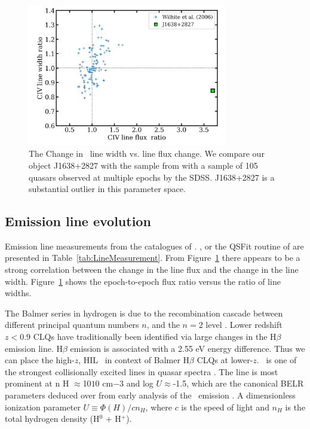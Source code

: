 \documentclass[a4paper,fleqn,usenatbib]{mnras}
\begin{document}
\begin{figure}
  \centering
  \includegraphics[width=8.7cm, trim=0.2cm 0.2cm 0.2cm 0.2cm, clip]
  {figures/Wilhite_2006_Fig2_redux_20190926.png}
   \vspace{-12pt}
  \caption[]{The Change in \civ\ line width vs. line flux change. 
We compare our object J1638+2827 with the sample 
from \citet{Wilhite2006} with a sample of 105 quasars observed at
multiple epochs by the SDSS. J1638+2827 is a substantial outlier 
in this parameter space.}
  \label{fig:Wilhite2006_comparison}
\end{figure}
\subsection{Emission line evolution}
Emission line measurements from the catalogues of  \citet{Shen2011}.
\citet{Hamann2017}, \citet{Kozlowski2017} or the QSFit routine of \citet{Calderone2017}
are presented in Table~\ref{tab:LineMeasurement}.
From Figure~\ref{fig:Wilhite2006_comparison} there appears to be a
strong correlation between the change in the line flux and the change
in the line width.  Figure~\ref{fig:Wilhite2006_comparison} shows the
epoch-to-epoch flux ratio versus the ratio of line widths.

The Balmer series in hydrogen is due to the recombination cascade
between different principal quantum numbers $n$, and
the $n=2$ level \citep[e.g., ][]{Seaton1959a, Seaton1959b}. 
Lower redshift $z<0.9$ CLQs have traditionally been identified via large changes in the
H$\beta$ emission line. H$\beta$ emission is associated with a 2.55 eV energy difference. 
Thus we can place the high-$z$, HIL \civ\ in context of Balmer H$\beta$ CLQs at lower-$z$. 
\civ\ is one of the strongest collisionally excited lines in quasar
spectra \citet[e.g.][]{HamannFerland1999}.  The line is most prominent
at n H $\approx$10$10$ cm$-3$ and log $U$$\approx$-1.5, which are the
canonical BELR parameters deduced over from early analysis of the
\civ\ emission \citep{Davidson_Netzer1979}.  A dimensionless
ionization parameter $U\equiv \Phi(H) / c n_{H}$, where $c$ is the
speed of light and $n_{H}$ is the total hydrogen density (H$^{0}$ +
H$^{+}$).
\end{document}
